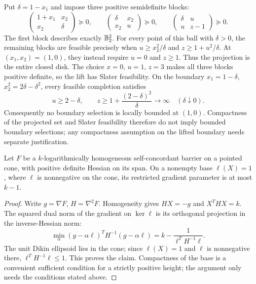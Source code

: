 \begin{example}
\label{ex:escaping-disk}
Put $\delta=1-x_1$ and impose three positive semidefinite blocks:
\[
 \begin{pmatrix}1+x_1&x_2\\x_2&\delta\end{pmatrix}\succeq0,
 \qquad
 \begin{pmatrix}\delta&x_2\\x_2&u\end{pmatrix}\succeq0,
 \qquad
 \begin{pmatrix}\delta&u\\u&z-1\end{pmatrix}\succeq0.
\]
The first block describes exactly $\mathbb B_2^2$. For every point of this
ball with $\delta>0$, the remaining blocks are feasible precisely when
$u\geq x_2^2/\delta$ and $z\geq1+u^2/\delta$. At $(x_1,x_2)=(1,0)$,
they instead require $u=0$ and $z\geq1$. Thus the projection is the
entire closed disk. The choice $x=0$, $u=1$, $z=3$ makes all three
blocks positive definite, so the lift has Slater feasibility.
On the boundary $x_1=1-\delta$, $x_2^2=2\delta-\delta^2$, every
feasible completion satisfies
\[
 u\geq2-\delta,\qquad
 z\geq1+\frac{(2-\delta)^2}{\delta}\longrightarrow\infty
 \quad(\delta\downarrow0).
\]
Consequently no boundary selection is locally bounded at $(1,0)$.
Compactness of the projected set and Slater feasibility therefore do
not imply bounded boundary selections; any compactness assumption on the lifted
boundary needs separate justification.
\end{example}

\begin{lemma}
\label{lem:compact-base-parameter}
Let $F$ be a $k$-logarithmically homogeneous self-concordant barrier on a
pointed cone, with positive definite Hessian on its span. On a nonempty
base $\ell(X)=1$, where $\ell$ is nonnegative on the cone, its restricted
gradient parameter is at most $k-1$.
\end{lemma}
\begin{proof}
Write $g=\nabla F$, $H=\nabla^2F$. Homogeneity gives
$HX=-g$ and $X^THX=k$. The squared dual norm of the gradient on
$\ker\ell$ is its orthogonal projection in the inverse-Hessian norm:
\[
 \min_\alpha(g-\alpha\ell)^TH^{-1}(g-\alpha\ell)
 =k-\frac1{\ell^TH^{-1}\ell}.
\]
The unit Dikin ellipsoid lies in the cone; since $\ell(X)=1$ and
$\ell$ is nonnegative there, $\ell^TH^{-1}\ell\leq1$. This proves the
claim. Compactness of the base is a convenient sufficient condition
for a strictly positive height; the argument only needs the conditions
stated above.
\end{proof}

